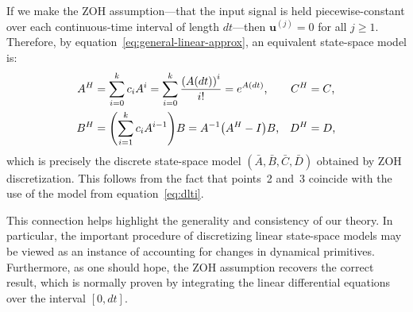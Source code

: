 \documentclass[12pt]{article}
\theoremstyle{definition}
\renewcommand{\vec}{\mathbf}  %
\let\originalleft\left
\let\originalright\right
\renewcommand{\left}{\mathopen{}\mathclose\bgroup\originalleft}
\renewcommand{\right}{\aftergroup\egroup\originalright}
\begin{document}
If we make the ZOH assumption---that the input signal is held piecewise-constant over each continuous-time interval of length $dt$---then $\vec{u}^{(j)} = 0$ for all $j \ge 1$.
Therefore, by equation~\ref{eq:general-linear-approx}, an equivalent state-space model is:
\begin{align*}
A^H &= \sum_{i=0}^k c_i A^i = \sum_{i=0}^k \frac{\left(A(dt)\right)^i}{i!} = e^{A(dt)} \text{,} & C^H &= C \text{,} \\
B^H &= \left( \sum_{i=1}^k c_i A^{i-1} \right) B = A^{-1} \left(A^H - I\right) B \text{,} & D^H &= D \text{,}
\end{align*}
which is precisely the discrete state-space model $(\bar{A}, \bar{B}, \bar{C}, \bar{D})$ obtained by ZOH discretization.
This follows from the fact that points~2 and~3 coincide with the use of the model from equation~\ref{eq:dlti}.

This connection helps highlight the generality and consistency of our theory.
In particular, the important procedure of discretizing linear state-space models may be viewed as an instance of accounting for changes in dynamical primitives.
Furthermore, as one should hope, the ZOH assumption recovers the correct result, which is normally proven by integrating the linear differential equations over the interval $[0\text{,}\, dt]$.


%
\end{document}
